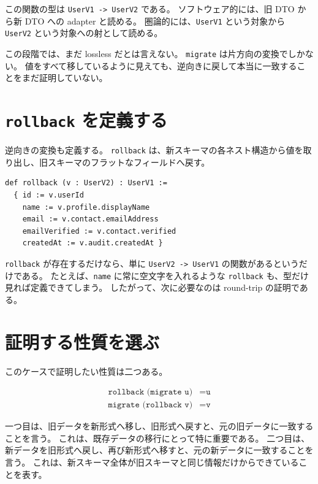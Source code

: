 この関数の型は \texttt{UserV1 -> UserV2} である。
ソフトウェア的には、旧 DTO から新 DTO への adapter と読める。
圏論的には、\texttt{UserV1} という対象から \texttt{UserV2} という対象への射として読める。

\begin{warningbox}
この段階では、まだ lossless だとは言えない。
\texttt{migrate} は片方向の変換でしかない。
値をすべて移しているように見えても、逆向きに戻して本当に一致することをまだ証明していない。
\end{warningbox}

\section{\texttt{rollback} を定義する}

逆向きの変換も定義する。
\texttt{rollback} は、新スキーマの各ネスト構造から値を取り出し、旧スキーマのフラットなフィールドへ戻す。

\begin{listing}[htbp]
\begin{verbatim}
def rollback (v : UserV2) : UserV1 :=
  { id := v.userId
    name := v.profile.displayName
    email := v.contact.emailAddress
    emailVerified := v.contact.verified
    createdAt := v.audit.createdAt }
\end{verbatim}
\caption{新スキーマから旧スキーマへの逆変換}
\label{lst:ch22-rollback}
\end{listing}

\texttt{rollback} が存在するだけなら、単に \texttt{UserV2 -> UserV1} の関数があるというだけである。
たとえば、\texttt{name} に常に空文字を入れるような \texttt{rollback} も、型だけ見れば定義できてしまう。
したがって、次に必要なのは round-trip の証明である。

\section{証明する性質を選ぶ}

このケースで証明したい性質は二つある。

\begin{align*}
\texttt{rollback (migrate u)} &= \texttt{u} \\
\texttt{migrate (rollback v)} &= \texttt{v}
\end{align*}

一つ目は、旧データを新形式へ移し、旧形式へ戻すと、元の旧データに一致することを言う。
これは、既存データの移行にとって特に重要である。
二つ目は、新データを旧形式へ戻し、再び新形式へ移すと、元の新データに一致することを言う。
これは、新スキーマ全体が旧スキーマと同じ情報だけからできていることを表す。

